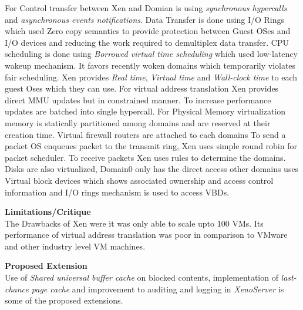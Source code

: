 \documentclass[a4paper, 11pt]{article}
\begin{document}
For Control transfer between Xen and Domian is using \emph{synchronous hypercalls} and \emph{asynchronous events notifications}. Data Transfer is done using I/O Rings which used Zero copy semantics to provide protection between Guest OSes and I/O devices and reducing the work required to demultiplex data transfer. CPU scheduling is done using \emph{Borrowed virtual time scheduling}
 which used low-latency wakeup mechanism. It favors recently woken domains which temporarily violates fair scheduling.  Xen provides \emph{Real time}, \emph{Virtual time} and \emph{Wall-clock time} to each guest Oses which they can use. For virtual address translation Xen provides direct MMU updates but in constrained manner. To increase performance updates are batched into single hypercall. For Physical Memory virtualization memory is statically partitioned among domains and are reserved at their creation time. Virtual firewall routers are attached to each domains To send a packet OS enqueues packet to the transmit ring, Xen uses simple round robin for packet scheduler. To receive packets Xen uses rules to determine the domains. Disks are also virtualized, Domain0 only has the direct access other domains uses Virtual block devices which shows associated ownership and access control information and I/O rings mechanism is used to access VBDs.
  
 
\noindent
\large\textbf{Limitations/Critique}\\
The Drawbacks of Xen were it was only able to scale upto 100 VMs. Its performance of virtual address translation was poor in comparison to VMware and other industry level VM machines.  

\noindent
\large\textbf{Proposed Extension}\\
Use of \emph{Shared universal buffer cache} on blocked contents, implementation of \emph{last-chance page cache} and improvement to auditing and logging in \emph{XenoServer} is some of the proposed extensions. 
\end{document}
